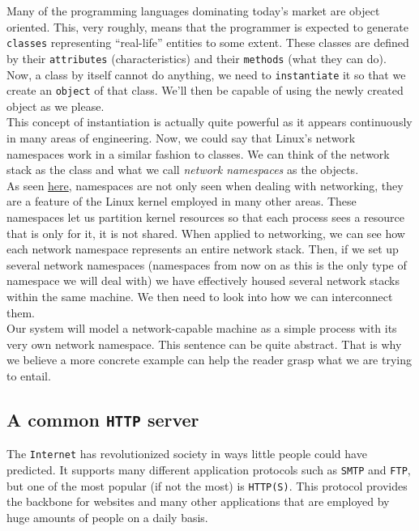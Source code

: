         Many of the programming languages dominating today's market are object oriented. This, very roughly, means that the programmer is expected to generate \texttt{classes} representing ``real-life'' entities to some extent. These classes are defined by their \texttt{attributes} (characteristics) and their \texttt{methods} (what they can do). Now, a class by itself cannot do anything, we need to \texttt{instantiate} it so that we create an \texttt{object} of that class. We'll then be capable of using the newly created object as we please.\\

        This concept of instantiation is actually quite powerful as it appears continuously in many areas of engineering. Now, we could say that Linux's network namespaces work in a similar fashion to classes. We can think of the network stack as the class and what we call \textit{network namespaces} as the objects.\\

        As seen \href{https://en.wikipedia.org/wiki/Linux_namespaces}{here}, namespaces are not only seen when dealing with networking, they are a feature of the Linux kernel employed in many other areas. These namespaces let us partition kernel resources so that each process sees a resource that is only for it, it is not shared. When applied to networking, we can see how each network namespace represents an entire network stack. Then, if we set up several network namespaces (namespaces from now on as this is the only type of namespace we will deal with) we have effectively housed several network stacks within the same machine. We then need to look into how we can interconnect them.\\

        Our system will model a network-capable machine as a simple process with its very own network namespace. This sentence can be quite abstract. That is why we believe a more concrete example can help the reader grasp what we are trying to entail.\\

        \subsection{A common \texttt{HTTP} server}
            The \texttt{Internet} has revolutionized society in ways little people could have predicted. It supports many different application protocols such as \texttt{SMTP} and \texttt{FTP}, but one of the most popular (if not the most) is \texttt{HTTP(S)}. This protocol provides the backbone for websites and many other applications that are employed by huge amounts of people on a daily basis.\\

